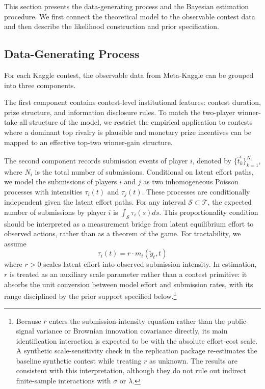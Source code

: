 \documentclass[mnsc]{informs3}
\begin{document}
This section presents the data-generating process and the Bayesian estimation procedure.
We first connect the theoretical model to the observable contest data and then describe the likelihood construction and prior specification.

\subsection{Data-Generating Process}

For each Kaggle contest, the observable data from Meta-Kaggle can be grouped into three components.

The first component contains contest-level institutional features: contest duration, prize structure, and information disclosure rules.
To match the two-player winner-take-all structure of the model, we restrict the empirical application to contests where a dominant top rivalry is plausible and monetary prize incentives can be mapped to an effective top-two winner-gain structure.

The second component records submission events of player $i$, denoted by $\{\hat{t}^i_k\}_{k=1}^{N_i}$, where $N_i$ is the total number of submissions.
Conditional on latent effort paths, we model the submissions of players $i$ and $j$ as two inhomogeneous Poisson processes with intensities $\tau_i(t)$ and $\tau_j(t)$. These processes are conditionally independent given the latent effort paths.
For any interval $\mathcal{S}\subset\mathcal{T}$, the expected number of submissions by player $i$ is $\int_{\mathcal{S}}\tau_i(s)ds$.
This proportionality condition should be interpreted as a measurement bridge from latent equilibrium effort to observed actions, rather than as a theorem of the game.
For tractability, we assume
\begin{equation}\label{eq-model-intensity}
\tau_i(t) = r \cdot m_i(\tilde{y}_t, t)
\end{equation}
where $r>0$ scales latent effort into observed submission intensity.
In estimation, $r$ is treated as an auxiliary scale parameter rather than a contest primitive: it absorbs the unit conversion between model effort and submission rates, with its range disciplined by the prior support specified below.\footnote{
Because $r$ enters the submission-intensity equation rather than the public-signal variance or Brownian innovation covariance directly, its main identification interaction is expected to be with the absolute effort-cost scale. 
A synthetic scale-sensitivity check in the replication package re-estimates the baseline synthetic contest while treating $r$ as unknown. 
The results are consistent with this interpretation, although they do not rule out indirect finite-sample interactions with $\sigma$ or $\lambda$.
}
\end{document}
